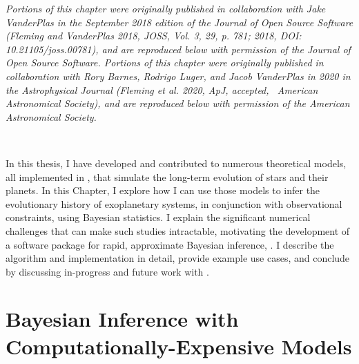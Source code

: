 \textit{Portions of this chapter were originally published in collaboration with Jake VanderPlas in the September 2018 edition of the Journal of Open Source Software (Fleming and VanderPlas 2018, JOSS, Vol. 3, 29, p. 781; 2018, DOI: 10.21105/joss.00781), and are reproduced below with permission of the Journal of Open Source Software. Portions of this chapter were originally published in collaboration with Rory Barnes, Rodrigo Luger, and Jacob VanderPlas in 2020 in the Astrophysical Journal (Fleming et al. 2020, ApJ, accepted, \textcopyright \ American Astronomical Society), and are reproduced below with permission of the American Astronomical Society.}

\

In this thesis, I have developed and contributed to numerous theoretical models, all implemented in \vplanet, that simulate the long-term evolution of stars and their planets. In this Chapter, I explore how I can use those models to infer the evolutionary history of exoplanetary systems, in conjunction with observational constraints, using Bayesian statistics. I explain the significant numerical challenges that can make such studies intractable, motivating the development of a software package for rapid, approximate Bayesian inference, \approxposterior \citep{FlemingVanderPlas2018}. I describe the \approxposterior algorithm and implementation in detail, provide example use cases, and conclude by discussing in-progress and future work with \approxposterior. 

\section{Bayesian Inference with Computationally-Expensive Models}

